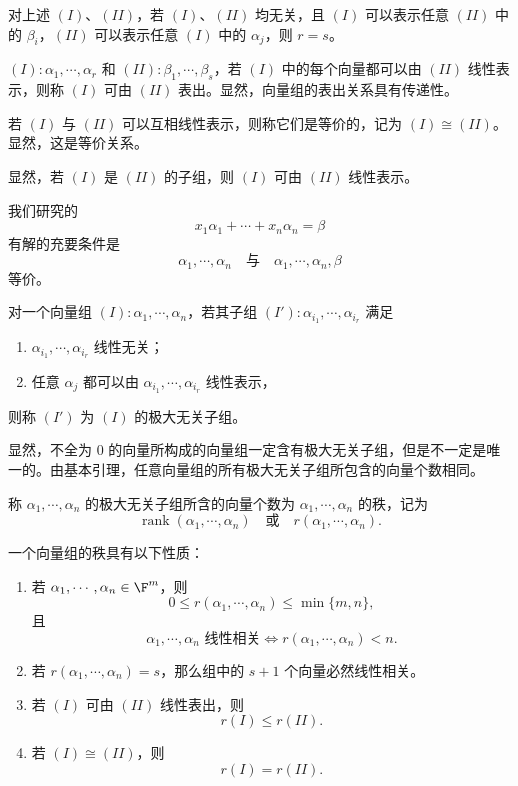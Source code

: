 \begin{corollary}
	对上述 $(I)$、$(II)$，若 $(I)$、$(II)$ 均无关，且 $(I)$ 可以表示任意 $(II)$ 中的 $\beta_i$，$(II)$ 可以表示任意 $(I)$ 中的 $\alpha_j$，则 $r=s$。
\end{corollary}

\begin{definition}
	$(I):\alpha_1,\cdots,\alpha_r$ 和 $(II):\beta_1,\cdots,\beta_s$，若 $(I)$ 中的每个向量都可以由 $(II)$ 线性表示，则称 $(I)$ 可由 $(II)$ 表出。显然，向量组的表出关系具有传递性。

	若 $(I)$ 与 $(II)$ 可以互相线性表示，则称它们是等价的，记为 $(I)\cong(II)$。显然，这是等价关系。

	显然，若 $(I)$ 是 $(II)$ 的子组，则 $(I)$ 可由 $(II)$ 线性表示。

	我们研究的
	\[
	x_1\alpha_1+\cdots+x_n\alpha_n=\beta
	\]
	有解的充要条件是
	\[
	\alpha_1,\cdots,\alpha_n
	\quad\text{与}\quad
	\alpha_1,\cdots,\alpha_n,\beta
	\]
	等价。
\end{definition}

\begin{definition}
	对一个向量组 $(I):\alpha_1,\cdots,\alpha_n$，若其子组
	$(I'):\alpha_{i_1},\cdots,\alpha_{i_r}$ 满足
	\begin{enumerate}
		\item $\alpha_{i_1},\cdots,\alpha_{i_r}$ 线性无关；
		\item 任意 $\alpha_j$ 都可以由 $\alpha_{i_1},\cdots,\alpha_{i_r}$ 线性表示，
	\end{enumerate}
	则称 $(I')$ 为 $(I)$ 的极大无关子组。

	显然，不全为 $0$ 的向量所构成的向量组一定含有极大无关子组，但是不一定是唯一的。由基本引理，任意向量组的所有极大无关子组所包含的向量个数相同。

	称 $\alpha_1,\cdots,\alpha_n$ 的极大无关子组所含的向量个数为
	$\alpha_1,\cdots,\alpha_n$ 的秩，记为
	\[
	\operatorname{rank}(\alpha_1,\cdots,\alpha_n)
	\quad\text{或}\quad
	r(\alpha_1,\cdots,\alpha_n).
	\]
\end{definition}

\begin{proposition}
	一个向量组的秩具有以下性质：
	\begin{enumerate}
		\item 若 $\alpha_1,\cdots,\alpha_n\in\F^m$，则
		\[
		0\leq r(\alpha_1,\cdots,\alpha_n)\leq\min\{m,n\},
		\]
		且
		\[
		\alpha_1,\cdots,\alpha_n\text{ 线性相关}
		\Longleftrightarrow
		r(\alpha_1,\cdots,\alpha_n)<n.
		\]
		\item 若 $r(\alpha_1,\cdots,\alpha_n)=s$，那么组中的 $s+1$ 个向量必然线性相关。
		\item 若 $(I)$ 可由 $(II)$ 线性表出，则
		\[
		r(I)\leq r(II).
		\]
		\item 若 $(I)\cong(II)$，则
		\[
		r(I)=r(II).
		\]
	\end{enumerate}
\end{proposition}

